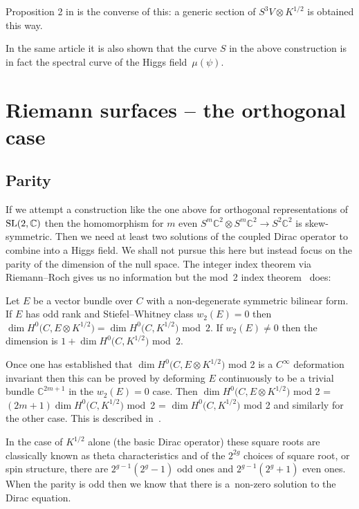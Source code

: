 \documentclass[pdftex]{sigma}
\newcommand{\C}{\mathbb{C}}
\begin{document}
\begin{remark}
Proposition 2 in \cite{Hitchin2} is the converse of this: a generic section of $S^3V\otimes K^{1/2}$ is obtained this way.
 \end{remark}
\begin{remark}
In the same article it is also shown that the curve $S$ in the above construction is in fact the spectral curve of the Higgs field~$\mu(\psi)$.
\end{remark}

\section{Riemann surfaces -- the orthogonal case}\label{section4}
\subsection{Parity}\label{section4.1}
If we attempt a construction like the one above for orthogonal representations of ${\rm SL}(2,\C)$ then the homomorphism for $m$ even $S^m\C^2\otimes S^m\C^2\rightarrow S^2\C^2$ is skew-symmetric. Then we need at least two solutions of the coupled Dirac operator to combine into a Higgs field. We shall not pursue this here but instead focus on the parity of the dimension of the null space. The integer index theorem via Riemann--Roch gives us no information but the mod~2 index theorem~\cite{AtiyahM/SingerI} does:
\begin{proposition} \label{mod2} Let $E$ be a vector bundle over $C$ with a non-degenerate symmetric bilinear form. If $E$ has odd rank and Stiefel--Whitney class $w_2(E)=0$ then
$\dim H^0\big(C, E\otimes K^{1/2}\big) = \dim H^0\big(C,K^{1/2}\big)$ {\rm mod}~$2$. If $w_2(E)\ne 0$ then the dimension is $1+\dim H^0\big(C,K^{1/2}\big)$ {\rm mod}~$2$.
\end{proposition}
Once one has established that $\dim H^0\big(C, E\otimes K^{1/2}\big)$ {\rm mod 2} is a $C^{\infty}$ deformation invariant then this can be proved by deforming $E$ continuously to be a trivial bundle $\C^{2m+1}$ in the $w_2(E)=0$ case. Then
$\dim H^0\big(C, E\otimes K^{1/2}\big)$ {\rm mod 2} = $(2m+1)\dim H^0\big(C,K^{1/2}\big)$ {\rm mod}~2 = $\dim H^0\big(C,K^{1/2}\big)$ {\rm mod} 2
and similarly for the other case. This is described in~\cite{Oxbury}.

In the case of $K^{1/2}$ alone (the basic Dirac operator) these square roots are classically known as theta characteristics and of the $2^{2g}$ choices of square root, or spin structure, there are $2^{g-1}(2^g-1)$ odd ones and $2^{g-1}(2^g+1)$ even ones. When the parity is odd then we know that there is a~non-zero solution to the Dirac equation.
\end{document}
